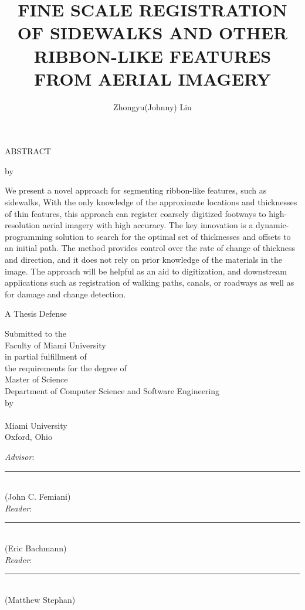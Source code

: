 \documentclass[12pt, oneside]{book2}
\title{FINE SCALE REGISTRATION OF SIDEWALKS AND OTHER RIBBON-LIKE FEATURES FROM AERIAL IMAGERY}
\author{Zhongyu(Johnny) Liu}
\def\Advisor{John C. Femiani}
\def\ReaderOne{Eric Bachmann}
\def\ReaderTwo{Matthew Stephan}
\def\Abstract{

    We present a novel approach for segmenting ribbon-like features, such as sidewalks, With the only knowledge of the approximate locations and thicknesses of thin features, this approach can register coarsely digitized footways to high-resolution aerial imagery with high accuracy. The key innovation is a dynamic-programming solution to search for the optimal set of thicknesses and offsets to an initial path. The method provides control over the rate of change of thickness and direction, and it does not rely on prior knowledge of the materials in the image. The approach will be helpful as an aid to digitization, and downstream applications such as registration of walking paths, canals, or roadways as well as for damage and change detection. 

}
\begin{document}
\thispagestyle{empty}
\singlespacing

\begin{center}
ABSTRACT

\vspace{2.0cm}

\makeatletter
\MakeUppercase{\@title}
\makeatother

\vspace{1.0cm}

by \makeatletter\@author\makeatother


\vspace{1.0cm}
\end{center}

\noindent \Abstract{}

\newpage

\thispagestyle{empty}

\frontmatter

\onehalfspacing

\begin{titlepage}
\begin{center}
\makeatletter
\MakeUppercase{\@title}
\makeatother

\vspace{1.5cm}

A Thesis Defense\\

\vspace{0.5cm}

Submitted to the \\
Faculty of Miami University \\
in partial fulfillment of \\
the requirements for the degree of \\
Master of Science \\
Department of Computer Science and Software Engineering \\
by \\
\makeatletter\@author\makeatother \\
Miami University \\
Oxford, Ohio \\
\the\year

\vspace{1.5cm}

\emph{Advisor}: \rule[-0.1cm]{8cm}{0.01cm} \\
(\Advisor) \\
\vspace{1.5cm}
\emph{Reader}: \rule[-0.1cm]{8cm}{0.01cm} \\
(\ReaderOne) \\
\vspace{1.5cm}
\emph{Reader}: \rule[-0.1cm]{8cm}{0.01cm} \\
(\ReaderTwo) \\
\end{center}
\end{titlepage}
\end{document}
